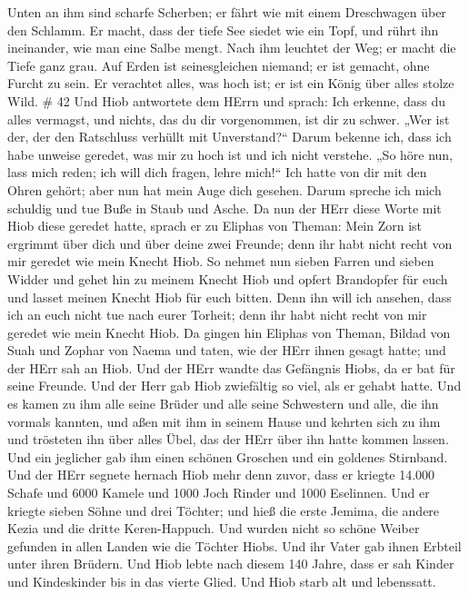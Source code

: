  Unten an ihm sind scharfe Scherben; er fährt wie mit einem
Dreschwagen über den Schlamm.  Er macht, dass der tiefe See
siedet wie ein Topf, und rührt ihn ineinander, wie man eine Salbe mengt.
 Nach ihm leuchtet der Weg; er macht die Tiefe ganz grau.
 Auf Erden ist seinesgleichen niemand; er ist gemacht, ohne
Furcht zu sein.  Er verachtet alles, was hoch ist; er ist
ein König über alles stolze Wild. \# 42  Und Hiob antwortete
dem HErrn und sprach:  Ich erkenne, dass du alles vermagst,
und nichts, das du dir vorgenommen, ist dir zu schwer.  „Wer
ist der, der den Ratschluss verhüllt mit Unverstand?{}`` Darum bekenne
ich, dass ich habe unweise geredet, was mir zu hoch ist und ich nicht
verstehe.  „So höre nun, lass mich reden; ich will dich
fragen, lehre mich!{}``  Ich hatte von dir mit den Ohren
gehört; aber nun hat mein Auge dich gesehen.  Darum spreche
ich mich schuldig und tue Buße in Staub und Asche.  Da nun
der HErr diese Worte mit Hiob diese geredet hatte, sprach er zu Eliphas
von Theman: Mein Zorn ist ergrimmt über dich und über deine zwei
Freunde; denn ihr habt nicht recht von mir geredet wie mein Knecht Hiob.
 So nehmet nun sieben Farren und sieben Widder und gehet hin
zu meinem Knecht Hiob und opfert Brandopfer für euch und lasset meinen
Knecht Hiob für euch bitten. Denn ihn will ich ansehen, dass ich an euch
nicht tue nach eurer Torheit; denn ihr habt nicht recht von mir geredet
wie mein Knecht Hiob.  Da gingen hin Eliphas von Theman,
Bildad von Suah und Zophar von Naema und taten, wie der HErr ihnen
gesagt hatte; und der HErr sah an Hiob.  Und der HErr
wandte das Gefängnis Hiobs, da er bat für seine Freunde. Und der Herr
gab Hiob zwiefältig so viel, als er gehabt hatte.  Und es
kamen zu ihm alle seine Brüder und alle seine Schwestern und alle, die
ihn vormals kannten, und aßen mit ihm in seinem Hause und kehrten sich
zu ihm und trösteten ihn über alles Übel, das der HErr über ihn hatte
kommen lassen. Und ein jeglicher gab ihm einen schönen Groschen und ein
goldenes Stirnband.  Und der HErr segnete hernach Hiob mehr
denn zuvor, dass er kriegte 14.000 Schafe und 6000 Kamele und 1000 Joch
Rinder und 1000 Eselinnen.  Und er kriegte sieben Söhne und
drei Töchter;  und hieß die erste Jemima, die andere Kezia
und die dritte Keren-Happuch.  Und wurden nicht so schöne
Weiber gefunden in allen Landen wie die Töchter Hiobs. Und ihr Vater gab
ihnen Erbteil unter ihren Brüdern.  Und Hiob lebte nach
diesem 140 Jahre, dass er sah Kinder und Kindeskinder bis in das vierte
Glied.  Und Hiob starb alt und lebenssatt.
